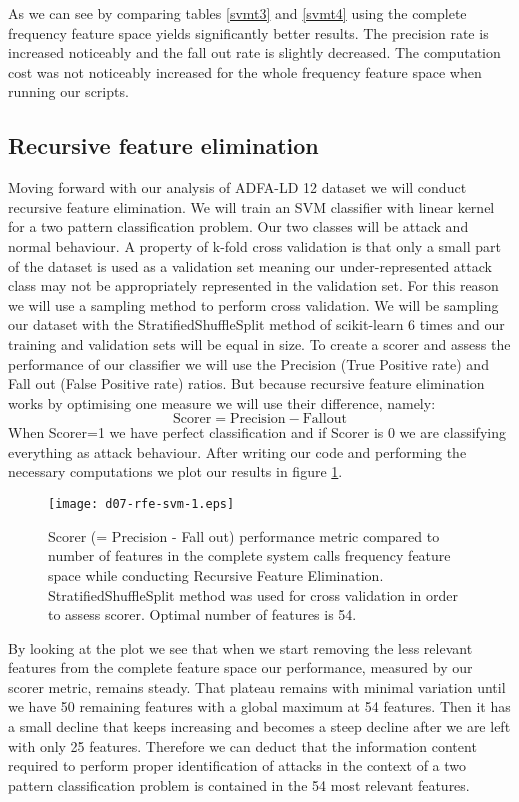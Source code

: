 \documentclass[reqno,openany,12pt]{amsbook}
\newcommand{\beqq}{\begin{equation*}}
\newcommand{\eeqq}{\end{equation*}}
\begin{document}
As we can see by comparing tables \ref{svmt3} and \ref{svmt4} using the complete frequency feature space yields significantly better results. The precision rate is increased noticeably and the fall out rate is slightly decreased. The computation cost was not noticeably increased for the whole frequency feature space when running our scripts.

\subsection{Recursive feature elimination}\mbox{}


Moving forward with our analysis of ADFA-LD 12 dataset we will conduct recursive feature elimination. We will train an SVM classifier with linear kernel for a two pattern classification problem. Our two classes will be attack and normal behaviour. A property of k-fold cross validation is that only a small part of the dataset is used as a validation set meaning our under-represented attack class may not be appropriately represented in the validation set. For this reason we will use a sampling method to perform cross validation. We will be sampling our dataset with the StratifiedShuffleSplit method of scikit-learn\cite{skl} 6 times and our training and validation sets will be equal in size. To create a scorer and assess the performance of our classifier we will use the Precision (True Positive rate) and Fall out (False Positive rate) ratios. But because recursive feature elimination works by optimising one measure we will use their difference, namely:
\beqq
\mathrm{Scorer = Precision - Fall out}
\eeqq
When Scorer=1 we have perfect classification and if Scorer is 0 we are classifying everything as attack behaviour. After writing our code and performing the necessary computations we plot our results in figure \ref{svm-fr3}.

\begin{figure}[th]
\texttt{[image: d07-rfe-svm-1.eps]}
\caption[Recursive Feature Elimination in the complete frequency feature space.]{Scorer (= Precision - Fall out) performance metric compared to number of features in the complete system calls frequency feature space while conducting Recursive Feature Elimination. StratifiedShuffleSplit method was used for cross validation in order to assess scorer. Optimal number of features is 54.}
\label{svm-fr3}
\end{figure}

By looking at the plot we see that when we start removing the less relevant features from the complete feature space our performance, measured by our scorer metric, remains steady. That plateau remains with minimal variation until we have 50 remaining features with a global maximum at 54 features. Then it has a small decline that keeps increasing and becomes a steep decline after we are left with only 25 features. Therefore we can deduct that the information content required to perform proper identification of attacks in the context of a two pattern classification problem is contained in the 54 most relevant features. 
\end{document}

